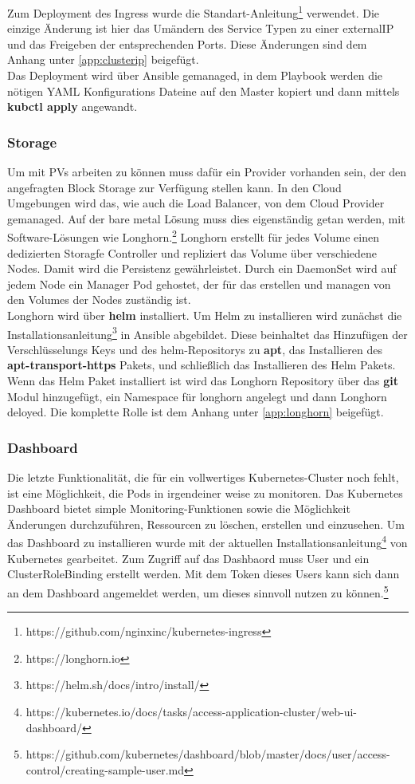 Zum Deployment des Ingress wurde die Standart-Anleitung\footnote{https://github.com/nginxinc/kubernetes-ingress} verwendet.
Die einzige Änderung ist hier das Umändern des Service Typen zu einer externalIP und das Freigeben der entsprechenden Ports.
Diese Änderungen sind dem Anhang unter \ref{app:clusterip} beigefügt.
\\
Das Deployment wird über Ansible gemanaged, in dem Playbook werden die nötigen \ac{YAML} Konfigurations Dateine auf den Master kopiert und dann mittels \textbf{kubctl apply} angewandt. 


\subsubsection{Storage}
Um mit \ac{PV}s arbeiten zu können muss dafür ein Provider vorhanden sein, der den angefragten Block Storage zur Verfügung stellen kann. 
In den Cloud Umgebungen wird das, wie auch die Load Balancer, von dem Cloud Provider gemanaged. 
Auf der bare metal Lösung muss dies eigenständig getan werden, mit Software-Lösungen wie Longhorn.\footnote{https://longhorn.io}
Longhorn erstellt für jedes Volume einen dedizierten Storagfe Controller und repliziert das Volume über verschiedene Nodes.
Damit wird die Persistenz gewährleistet.
Durch ein DaemonSet wird auf jedem Node ein Manager Pod gehostet, der für das erstellen und managen von den Volumes der Nodes zuständig ist. 
\\
Longhorn wird über \textbf{helm} installiert. 
Um Helm zu installieren wird zunächst die Installationsanleitung\footnote{https://helm.sh/docs/intro/install/} in Ansible abgebildet.
Diese beinhaltet das Hinzufügen der Verschlüsselungs Keys und des helm-Repositorys zu \textbf{apt}, das Installieren des \textbf{apt-transport-https} Pakets, und schließlich das Installieren des Helm Pakets.
\\
Wenn das Helm Paket installiert ist wird das Longhorn Repository über das \textbf{git} Modul hinzugefügt, ein Namespace für longhorn angelegt und dann Longhorn deloyed.
Die komplette Rolle ist dem Anhang unter \ref{app:longhorn} beigefügt.

\subsubsection{Dashboard}
Die letzte Funktionalität, die für ein vollwertiges Kubernetes-Cluster noch fehlt, ist eine Möglichkeit, die Pods in irgendeiner weise zu monitoren.
Das Kubernetes Dashboard bietet simple Monitoring-Funktionen sowie die Möglichkeit Änderungen durchzuführen, Ressourcen zu löschen, erstellen und einzusehen.
Um das Dashboard zu installieren wurde mit der aktuellen Installationsanleitung\footnote{https://kubernetes.io/docs/tasks/access-application-cluster/web-ui-dashboard/} von Kubernetes gearbeitet.
Zum Zugriff auf das Dashbaord muss User und ein ClusterRoleBinding erstellt werden. 
Mit dem Token dieses Users kann sich dann an dem Dashboard angemeldet werden, um dieses sinnvoll nutzen zu können.\footnote{https://github.com/kubernetes/dashboard/blob/master/docs/user/access-control/creating-sample-user.md}

